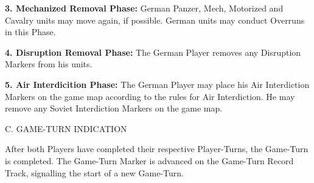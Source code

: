 \textbf{3. Mechanized Removal Phase:} German Panzer, Mech, Motorized and Cavalry units may move again, if possible. German units may conduct Overruns in this Phase.

\textbf{4. Disruption Removal Phase:} The German Player removes any Disruption Markers from his units.

\textbf{5. Air Interdicition Phase:} The German Player may place his Air Interdiction Markers on the game map according to the rules for Air Interdiction. He may remove any Soviet Interdiction Markers on the game map.

C. GAME-TURN INDICATION

After both Players have completed their respective Player-Turns, the Game-Turn is completed. The Game-Turn Marker is advanced on the Game-Turn Record Track, signalling the start of a new Game-Turn.